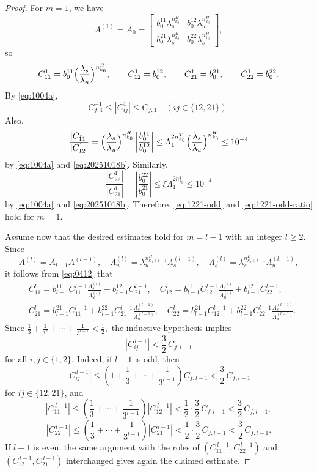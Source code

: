 \documentclass{amsart}
\theoremstyle{plain}
\theoremstyle{definition}
\theoremstyle{remark}
\numberwithin{equation}{section}
\begin{document}
\begin{proof}
For $m=1$, we have
\[
A^{(1)}=A_0=
\begin{bmatrix}
b_0^{11}\lambda_s^{n_{k_0}^H} & b_0^{12}\lambda_u^{n_{k_0}^H}\\
b_0^{21}\lambda_s^{n_{k_0}^H} & b_0^{22}\lambda_s^{n_{k_0}^H}
\end{bmatrix},
\]
so
\[
C_{11}^1=b_0^{11}\Bigl(\frac{\lambda_s}{\lambda_u}\Bigr)^{n_{k_0}^H},
\qquad
C_{12}^1=b_0^{12},
\qquad
C_{21}^1=b_0^{21},
\qquad
C_{22}^1=b_0^{22}.
\]
By \eqref{eq:1004a},
\[
C_{f,1}^{-1}\le |C_{ij}^1|\le C_{f,1}\quad (ij\in\{12,21\}).
\]
Also,
\[
\frac{|C_{11}^1|}{|C_{12}^1|}
=
\Bigl(\frac{\lambda_s}{\lambda_u}\Bigr)^{n_{k_0}^H}
\left|\frac{b_0^{11}}{b_0^{12}}\right|
\le
\Lambda_1^{2n_{k_0}^T}
\Bigl(\frac{\lambda_s}{\lambda_u}\Bigr)^{n_{k_0}^H}
\le 10^{-4}
\]
by \eqref{eq:1004a} and \eqref{eq:20251018b}. Similarly,
\[
\frac{|C_{22}^1|}{|C_{21}^1|}
=
\left|\frac{b_0^{22}}{b_0^{21}}\right|
\le
\xi \Lambda_1^{2n_{k_0}^T}
\le 10^{-4}
\]
by \eqref{eq:1004a} and \eqref{eq:20251018b}. 
Therefore, \eqref{eq:1221-odd} and \eqref{eq:1221-odd-ratio} hold for $m=1$.

Assume now that the desired estimates hold for $m=l-1$ with an integer $l\ge 2$.
Since
\[
A^{(l)}=A_{l-1}A^{(l-1)},
\quad
\Lambda_u^{(l)}=\lambda_u^{n_{k_0+l-1}^H}\Lambda_s^{(l-1)},
\quad
\Lambda_s^{(l)}=\lambda_s^{n_{k_0+l-1}^H}\Lambda_u^{(l-1)},
\]
it follows from \eqref{eq:0412} that
\begin{align*}
&C_{11}^{l}
=b_{l-1}^{11}C_{11}^{l-1}\frac{\Lambda_s^{(l)}}{\Lambda_u^{(l)}}+b_{l-1}^{12}C_{21}^{l-1},\quad
C_{12}^{l}
=b_{l-1}^{11}C_{12}^{l-1}\frac{\Lambda_s^{(l)}}{\Lambda_u^{(l)}}+b_{l-1}^{12}C_{22}^{l-1},\\
&C_{21}^{l}
=b_{l-1}^{21}C_{11}^{l-1}+b_{l-1}^{22}C_{21}^{l-1}\frac{\Lambda_s^{(l-1)}}{\Lambda_u^{(l-1)}},\quad
C_{22}^{l}
=b_{l-1}^{21}C_{12}^{l-1}+b_{l-1}^{22}C_{22}^{l-1}\frac{\Lambda_s^{(l-1)}}{\Lambda_u^{(l-1)}}.
\end{align*}
Since
$
\frac{1}{3}+\frac{1}{3^2}+\cdots +\frac{1}{3^{l-1}}<\frac12,
$
the inductive hypothesis implies
\[
|C_{ij}^{\,l-1}|<\frac32\,C_{f,l-1}
\]
for all $i,j\in\{1,2\}$.
Indeed, if $l-1$ is odd, then
\[
|C_{ij}^{\,l-1}|
\le
\left(1+\frac{1}{3}+\cdots +\frac{1}{3^{l-1}}\right)C_{f,l-1}
<
\frac32\,C_{f,l-1}
\]
for $ij\in\{12,21\}$,
and
\[
|C_{11}^{\,l-1}|
\le
\left(\frac{1}{3}+\cdots +\frac{1}{3^{l-1}}\right)|C_{12}^{\,l-1}|
<
\frac12\cdot\frac32\,C_{f,l-1}
<
\frac32\,C_{f,l-1},
\]
\[
|C_{22}^{\,l-1}|
\le
\left(\frac{1}{3}+\cdots +\frac{1}{3^{l-1}}\right)|C_{21}^{\,l-1}|
<
\frac12\cdot\frac32\,C_{f,l-1}
<
\frac32\,C_{f,l-1}.
\]
If $l-1$ is even, the same argument with the roles of
$(C_{11}^{\,l-1},C_{22}^{\,l-1})$ and $(C_{12}^{\,l-1},C_{21}^{\,l-1})$
interchanged gives again the claimed estimate.


\end{proof}
\end{document}

